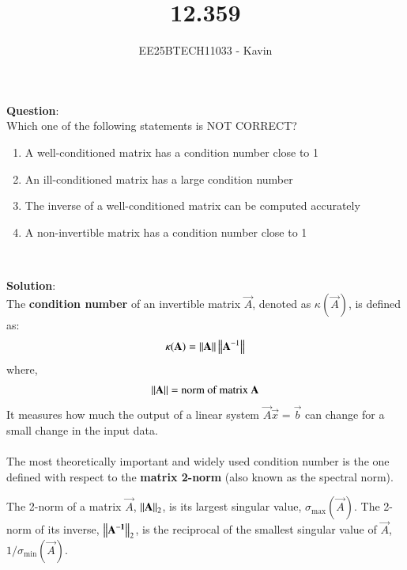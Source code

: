 \documentclass[journal]{IEEEtran}
\begin{document}

\vspace{3cm}

\title{12.359}
\author{EE25BTECH11033 - Kavin}
{\let\newpage\relax\maketitle}

\renewcommand{\thefigure}{\theenumi}
\renewcommand{\thetable}{\theenumi}
\setlength{\intextsep}{10pt} %
\textbf{Question}:\\
Which one of the following statements is NOT CORRECT?

\begin{enumerate}
\item A well-conditioned matrix has a condition number close to 1  
\item An ill-conditioned matrix has a large condition number  
\item The inverse of a well-conditioned matrix can be computed accurately  
\item A non-invertible matrix has a condition number close to 1  
\end{enumerate}\\    
\bigskip

\textbf{Solution}:\\
The \textbf{condition number} of an invertible matrix $\vec{A}$, denoted as $\kappa(\vec{A})$, is defined as:
\begin{align}
    \kappa(\mathbf{A}) = \left\lVert\mathbf{A}\right\rVert \left\lVert\mathbf{A}^{-1}\right\rVert
\end{align}
where,
\begin{align*}
    \left\lVert\mathbf{A}\right\rVert = \text{norm of matrix $\mathbf{A}$}
\end{align*}
It measures how much the output of a linear system $\vec{A}\vec{x}=\vec{b}$ can change for a small change in the input data.\\
\\
The most theoretically important and widely used condition number is the one defined with respect to the \textbf{matrix 2-norm} (also known as the spectral norm).

The 2-norm of a matrix $\vec{A}$, $\left\lVert\mathbf{A}\right\rVert_2$, is its largest singular value, $\sigma_{\text{max}}(\vec{A})$. The 2-norm of its inverse, $\left\lVert\mathbf{A^{-1}}\right\rVert_2$, is the reciprocal of the smallest singular value of $\vec{A}$, $1/\sigma_{\text{min}}(\vec{A})$.
\end{document}
